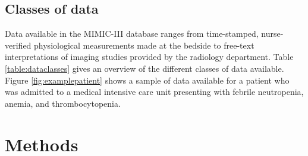 \documentclass[english]{article}
\begin{document}



\subsection*{Classes of data}

Data available in the MIMIC-III database ranges from time-stamped, nurse-verified physiological measurements made at the bedside to free-text interpretations of imaging studies provided by the radiology department. Table \ref{table:dataclasses} gives an overview of the different classes of data available. Figure \ref{fig:examplepatient} shows a sample of data available for a patient who was admitted to a medical intensive care unit presenting with febrile neutropenia, anemia, and thrombocytopenia.

\section*{Methods}


\end{document}
